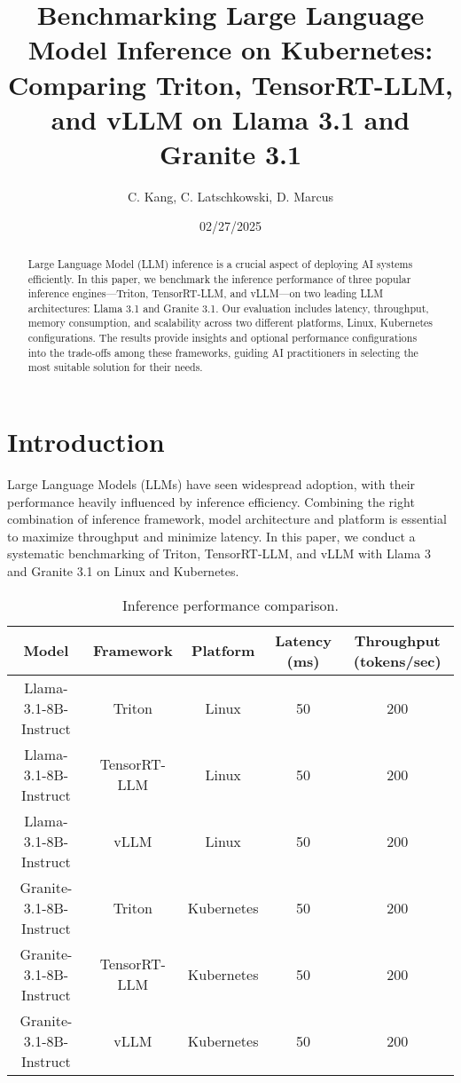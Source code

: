\documentclass[11pt, oneside]{article}   	%
\title{Benchmarking Large Language Model Inference on Kubernetes: Comparing Triton, TensorRT-LLM, and vLLM on Llama 3.1 and Granite 3.1}
\author{C. Kang, C. Latschkowski, D. Marcus}
\date{02/27/2025}							%
\begin{document}
\maketitle

\begin{abstract}
Large Language Model (LLM) inference is a crucial aspect of deploying AI systems efficiently. In this paper, we benchmark the inference performance of three popular inference engines—Triton, TensorRT-LLM, and vLLM—on two leading LLM architectures: Llama 3.1 and Granite 3.1. Our evaluation includes latency, throughput, memory consumption, and scalability across two different platforms, Linux, Kubernetes configurations. The results provide insights and optional performance configurations into the trade-offs among these frameworks, guiding AI practitioners in selecting the most suitable solution for their needs.
\end{abstract}

\section{Introduction}
Large Language Models (LLMs) have seen widespread adoption, with their performance heavily influenced by inference efficiency. Combining the right combination of inference framework, model architecture and platform is essential to maximize throughput and minimize latency. In this paper, we conduct a systematic benchmarking of Triton, TensorRT-LLM, and vLLM with Llama 3 and Granite 3.1 on Linux and Kubernetes.

\begin{table}[h]
    \centering
    \begin{tabular}{|c|c|c|c|c|}
        \hline
        Model & Framework & Platform & Latency (ms) & Throughput (tokens/sec) \\
        \hline
        Llama-3.1-8B-Instruct & Triton & Linux & 50 & 200 \\
        Llama-3.1-8B-Instruct & TensorRT-LLM & Linux & 50 & 200 \\
        Llama-3.1-8B-Instruct & vLLM & Linux & 50 & 200 \\
        Granite-3.1-8B-Instruct & Triton & Kubernetes & 50 & 200 \\
        Granite-3.1-8B-Instruct & TensorRT-LLM & Kubernetes & 50 & 200 \\
        Granite-3.1-8B-Instruct & vLLM & Kubernetes & 50 & 200 \\
        \hline
    \end{tabular}
    \caption{Inference performance comparison.}
    \label{tab:performance}
\end{table}
\end{document}

